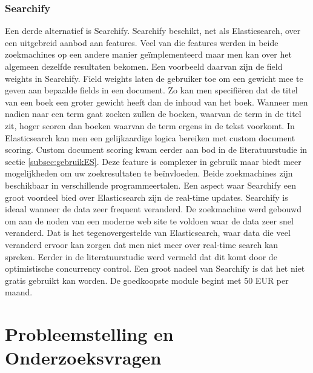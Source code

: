 \subsubsection{Searchify}

Een derde alternatief is Searchify. Searchify beschikt, net als Elasticsearch, over een uitgebreid aanbod aan features. Veel van die features werden in beide zoekmachines op een andere manier geïmplementeerd maar men kan over het algemeen dezelfde resultaten bekomen. Een voorbeeld daarvan zijn de field weights in Searchify. Field weights laten de gebruiker toe om een gewicht mee te geven aan bepaalde fields in een document. Zo kan men specifiëren dat de titel van een boek een groter gewicht heeft dan de inhoud van het boek. Wanneer men nadien naar een term gaat zoeken zullen de boeken, waarvan de term in de titel zit, hoger scoren dan boeken waarvan de  term ergens in de tekst voorkomt. In Elasticsearch kan men een gelijkaardige logica bereiken met custom document scoring. Custom document scoring kwam eerder aan bod in de literatuurstudie in sectie \ref{subsec:gebruikES}. Deze feature is complexer in gebruik maar biedt meer mogelijkheden om uw zoekresultaten te beïnvloeden. Beide zoekmachines zijn beschikbaar in verschillende programmeertalen. Een aspect waar Searchify een groot voordeel bied over Elasticsearch zijn de real-time updates. Searchify is ideaal wanneer de data zeer frequent veranderd. De zoekmachine werd gebouwd om aan de noden van een moderne web site te voldoen waar de data zeer snel veranderd. Dat is het tegenovergestelde van Elasticsearch, waar data die veel veranderd ervoor kan zorgen dat men niet meer over real-time search kan spreken. Eerder in de literatuurstudie werd vermeld dat dit komt door de optimistische concurrency control. Een groot nadeel van Searchify is dat het niet gratis gebruikt kan worden. De goedkoopste module begint met 50 EUR per maand.



\section{Probleemstelling en Onderzoeksvragen}
\label{sec:onderzoeksvragen}


